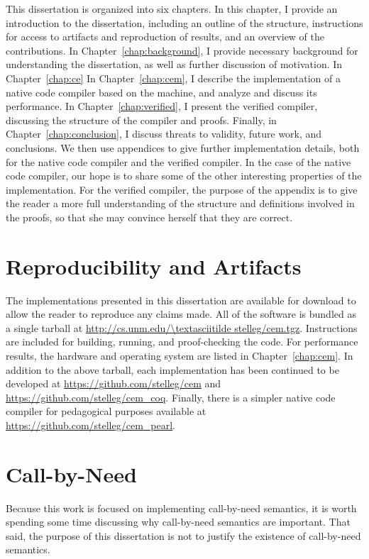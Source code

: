 This dissertation is organized into six chapters. In this chapter, I provide
an introduction to the dissertation, including an outline of the structure,
instructions for access to artifacts and reproduction of results, and an
overview of the contributions. In Chapter~\ref{chap:background}, I provide
necessary background for understanding the dissertation, as well as further
discussion of motivation. In Chapter~\ref{chap:ce}  In Chapter~\ref{chap:cem},
I describe the implementation of a native code compiler based on the \ce
machine, and analyze and discuss its performance. In
Chapter~\ref{chap:verified}, I present the verified compiler, discussing the
structure of the compiler and proofs. Finally, in Chapter~\ref{chap:conclusion},
I discuss threats to validity, future work, and conclusions. We then use
appendices to give further implementation details, both for the native code
compiler and the verified compiler. In the case of the native code compiler, our
hope is to share some of the other interesting properties of the implementation.
For the verified compiler, the purpose of the appendix is to give the reader a
more full understanding of the structure and definitions involved in the proofs,
so that she may convince herself that they are correct.

\section{Reproducibility and Artifacts}

The implementations presented in this dissertation are available for download to
allow the reader to reproduce any claims made. All of the software is bundled as
a single tarball at \url{http://cs.unm.edu/\textasciitilde stelleg/cem.tgz}.
Instructions are included for building, running, and proof-checking the code.
For performance results, the hardware and operating system are listed in
Chapter~\ref{chap:cem}. In addition to the above tarball, each implementation has been
continued to be developed at \url{https://github.com/stelleg/cem} and
\url{https://github.com/stelleg/cem\_coq}. Finally, there is a simpler native
code compiler for pedagogical purposes available at
\url{https://github.com/stelleg/cem\_pearl}. 

\section{Call-by-Need}

Because this work is focused on implementing call-by-need semantics, it is worth
spending some time discussing why call-by-need semantics are important. That
said, the purpose of this dissertation is not to justify the existence of
call-by-need semantics. 

